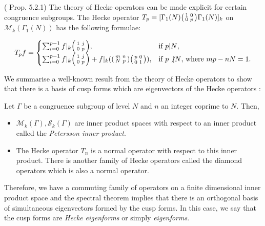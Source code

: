 \begin{example} (\cite{Shurman} Prop. 5.2.1)
The theory of Hecke operators can be made explicit for certain congruence subgroups. The Hecke operator $T_p = [ \Gamma_1(N) \begin{psmallmatrix} 1 & 0 \\ 0 & p \end{psmallmatrix} \Gamma_1(N)]_k $ on $\mathcal{M}_k(\Gamma_1(N))$ has the following formulae:

\[T_p f =
\begin{cases}
\sum_{i = 0}^{p-1} f|_k \begin{psmallmatrix}
    1 & j \\ 0 & p \end{psmallmatrix}, & \text{if $p | N$,} \\
\sum_{i = 0}^{p-1} f|_k \begin{psmallmatrix}
    1 & j \\ 0 & p \end{psmallmatrix} + f|_k (\begin{psmallmatrix} m & n \\ N & p \end{psmallmatrix} \begin{psmallmatrix}
        p & 0 \\ 0 & 1
    \end{psmallmatrix}), & \text{if $p\not | N$, where $mp - nN = 1$.} \\
\end{cases} 
\]
\end{example}

We summarise a well-known result from the theory of Hecke operators to show that there is a basis of cusp forms which are eigenvectors of the Hecke operators \cite{Shurman}:

\begin{theorem}
Let $\Gamma$ be a congruence subgroup of level $N$ and $n$ an integer coprime to $N$. Then,

\begin{itemize}
\item $\mathcal{M}_k(\Gamma),\mathcal{S}_k(\Gamma)$ are inner product spaces with respect to an inner product called the \textit{Petersson inner product}.
\item The Hecke operator $T_n$ is a normal operator with respect to this inner product. There is another family of Hecke operators called the diamond operators which is also a normal operator.
\end{itemize}

Therefore, we have a commuting family of operators on a finite dimensional inner product space and the spectral theorem implies that there is an orthogonal basis of simultaneous eigenvectors formed by the cusp forms. In this case, we say that the cusp forms are \textit{Hecke eigenforms} or simply \textit{eigenforms}.
\end{theorem}

